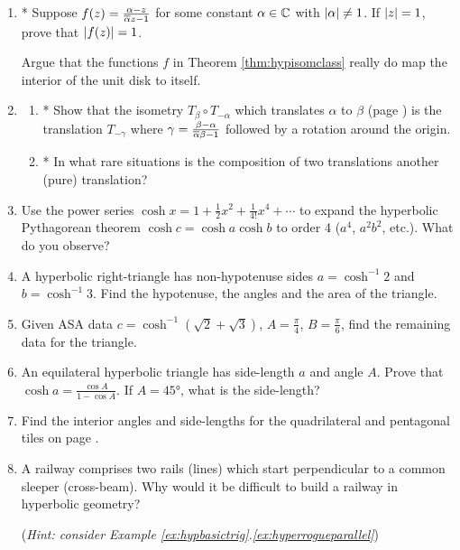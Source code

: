 \begin{exercises}
\begin{enumerate}
	  
	  \item* Suppose $f(z)=\frac{\alpha-z}{\overline{\alpha} z-1}$ for some constant $\alpha\in\mathbb{C}$ with $\left| \alpha\right|\neq 1$. If $\left| z\right|=1$, prove that $\left| f(z)\right|=1$.\par
	  Argue that the functions $f$ in Theorem \ref{thm:hypisomclass} really do map the interior of the unit disk to itself.
	  
	  
 		\item\begin{enumerate}
 		  \item* Show that the isometry $T_\beta\circ T_{-\alpha}$ which translates $\alpha$ to $\beta$ (page \pageref{pg:hypisomclass}) is the translation $T_{-\gamma}$ where $\gamma=\frac{\beta-\alpha}{\overline{\alpha}\beta-1}$ followed by a rotation around the origin.
 		  \item* In what rare situations is the composition of two translations another (pure) translation?
 		\end{enumerate}
	
	  
		\item Use the power series $\cosh x=1+\frac 12x^2+\frac 1{4!}x^4+\cdots$ to expand the hyperbolic Pythagorean theorem $\cosh c=\cosh a\cosh b$ to order 4 ($a^4$, $a^2b^2$, etc.). What do you observe?
	
	  
	  \item A hyperbolic right-triangle has non-hypotenuse sides $a=\cosh^{-1}2$ and $b=\cosh^{-1}3$. Find the hypotenuse, the angles and the area of the triangle.
	  
	  
		\item Given ASA data $c=\cosh^{-1}(\sqrt 2+\sqrt 3)$, $A=\frac\pi 4$, $B=\frac\pi 6$, find the remaining data for the triangle.
	  
	  
		\item An equilateral hyperbolic triangle has side-length $a$ and angle $A$. Prove that $\cosh a =\frac{\cos A}{1-\cos A}$. If $A=\ang{45}$, what is the side-length?
		
		
		\item Find the interior angles and side-lengths for the quadrilateral and pentagonal tiles on page \pageref{pg:hyptiling}.
		
		
		\item A railway comprises two rails (lines) which start perpendicular to a common sleeper (cross-beam). Why would it be difficult to build a railway in hyperbolic geometry?\par
		(\emph{Hint: consider Example \ref*{ex:hypbasictrig}.\ref{ex:hyperrogueparallel}})
		

\end{enumerate}
\end{exercises}
